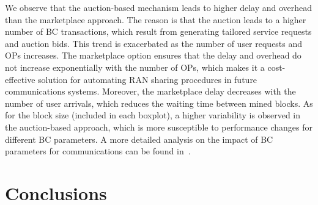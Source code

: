 \documentclass[journal]{IEEEtran}
\begin{document}
We observe that the auction-based mechanism leads to higher delay and overhead than the marketplace approach. The reason is that the auction leads to a higher number of BC transactions, which result from generating tailored service requests and auction bids. This trend is exacerbated as the number of user requests and OPs increases. The marketplace option ensures that the delay and overhead do not increase exponentially with the number of OPs, which makes it a cost-effective solution for automating RAN sharing procedures in future communications systems. Moreover, the marketplace delay decreases with the number of user arrivals, which reduces the waiting time between mined blocks. As for the block size (included in each boxplot), a higher variability is observed in the auction-based approach, which is more susceptible to performance changes for different BC parameters. A more detailed analysis on the impact of BC parameters for communications can be found in~\cite{FWilhelmi_PIMRC}.

\section{Conclusions}
\label{section:conclusions}
\end{document}
